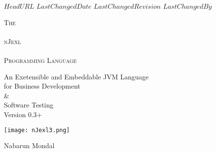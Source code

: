 \svnidlong
{$HeadURL$}
{$LastChangedDate$}
{$LastChangedRevision$}
{$LastChangedBy$}

\thispagestyle{titlepage}

\begin{center}
  \newlength{\parSepLength}
  \setlength{\parSepLength}{10ex}

  \Large
  \centering

  \thinRule\par
  \par\vspace{0.45\parSepLength}
  \begin{minipage}{\textwidth}
    \centering
    \fontsize{40pt}{30pt}\selectfont\titleColor\scshape
    The \\ ~ \\ nJexl \\ ~ \\ Programming Language  
  \end{minipage}
  \par\vspace{0.45\parSepLength}
  \par\thinRule

  \vspace{0.125\parSepLength}

  \begin{minipage}{\textwidth}
    \centering
    An Exetensible and Embeddable JVM Language \\ for Business Development \\ \& \\ Software Testing \\
    Version 0.3+
  \end{minipage}

  \vfill
 
  \begin{minipage}{0.8\textwidth}
    \centering
    \texttt{[image: nJexl3.png]}
  \end{minipage}

 \vfill
 
  \begin{minipage}{\textwidth}
    \centering
    \Large
    Nabarun Mondal 
  \end{minipage}

  \vfill

 
\end{center}
